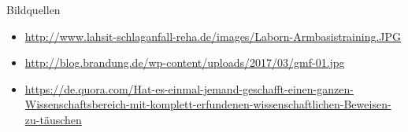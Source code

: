 \documentclass[hyphens]{beamer}
\begin{document}
 \begin{frame}{Bildquellen}
\begin{itemize}
	\item \small{\url{http://www.lahsit-schlaganfall-reha.de/images/Laborn-Armbasistraining.JPG}}
	\item \small{\url{http://blog.brandung.de/wp-content/uploads/2017/03/gmf-01.jpg}}
	\item \small{\url{https://de.quora.com/Hat-es-einmal-jemand-geschafft-einen-ganzen-Wissenschaftsbereich-mit-komplett-erfundenen-wissenschaftlichen-Beweisen-zu-täuschen}}
\end{itemize}
\end{frame}

 \titlepage
\end{document}
